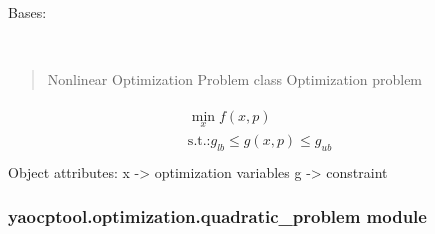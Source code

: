 \documentclass[letterpaper,10pt,english]{sphinxmanual}
\begin{document}
\begin{fulllineitems}
\label{\detokenize{yaocptool.optimization:yaocptool.optimization.nonlinear_problem.NonlinearOptimizationProblem}}
Bases: {\hyperref[\detokenize{yaocptool.optimization:yaocptool.optimization.abstract_optimization_problem.AbstractOptimizationProblem}]{}}

\begin{fulllineitems}
\label{\detokenize{yaocptool.optimization:yaocptool.optimization.nonlinear_problem.NonlinearOptimizationProblem.__init__}}~\begin{quote}

Nonlinear Optimization Problem class
Optimization problem
\end{quote}
\begin{align*}\!\begin{aligned}
\min_x f(x, p)\\
\textrm{s.t.:} g_{lb} \leq g(x,p) \leq g_{ub}\\
\end{aligned}\end{align*}
Object attributes:
x -\textgreater{} optimization variables
g -\textgreater{} constraint

\end{fulllineitems}


\end{fulllineitems}



\subsubsection{yaocptool.optimization.quadratic\_problem module}
\label{\detokenize{yaocptool.optimization:module-yaocptool.optimization.quadratic_problem}}\label{\detokenize{yaocptool.optimization:yaocptool-optimization-quadratic-problem-module}}
\end{document}
